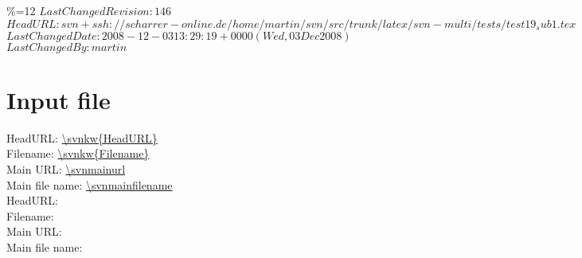 \begingroup
\catcode\%=12
\svnidlong
{$LastChangedRevision: 146 $}
{$HeadURL: svn+ssh://scharrer-online.de/home/martin/svn/src/trunk/latex/svn-multi/tests/test19_sub1.tex $}
{$LastChangedDate: 2008-12-03 13:29:19 +0000 (Wed, 03 Dec 2008) $}
{$LastChangedBy: martin $}
\endgroup


\section{Input file}

\noindent
HeadURL: \url{\svnkw{HeadURL}} \\
Filename: \url{\svnkw{Filename}} \\
Main URL: \url{\svnmainurl} \\
Main file name: \url{\svnmainfilename} \\

\noindent
HeadURL:  \\
Filename:  \\
Main URL: \svnnolinkurl{\svnmainurl} \\
Main file name: \svnnolinkurl{\svnmainfilename} \\

